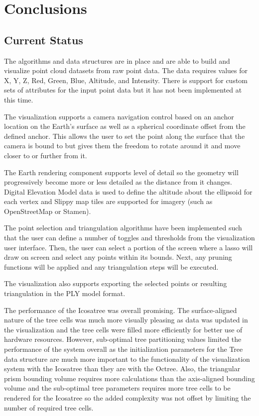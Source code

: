 \chapter{Conclusions}

\section{Current Status}

The algorithms and data structures are in place and are able to build and
visualize point cloud datasets from raw point data. The data requires values for
X, Y, Z, Red, Green, Blue, Altitude, and Intensity. There is support for custom
sets of attributes for the input point data but it has not been implemented at
this time.

The visualization supports a camera navigation control based on an anchor
location on the Earth's surface as well as a spherical coordinate offset from
the defined anchor. This allows the user to set the point along the surface that
the camera is bound to but gives them the freedom to rotate around it and move
closer to or further from it.

The Earth rendering component supports level of detail so the geometry will
progressively become more or less detailed as the distance from it changes.
Digital Elevation Model data is used to define the altitude about the ellipsoid
for each vertex and Slippy map tiles are supported for imagery (such as
OpenStreetMap or Stamen).

The point selection and triangulation algorithms have been implemented such that
the user can define a number of toggles and thresholds from the visualization
user interface. Then, the user can select a portion of the screen where a lasso
will draw on screen and select any points within its bounds. Next, any pruning
functions will be applied and any triangulation steps will be executed.

The visualization also supports exporting the selected points or resulting
triangulation in the PLY model format.

The performance of the Icosatree was overall promising. The surface-aligned
nature of the tree cells was much more visually pleasing as data was updated in
the visualization and the tree cells were filled more efficiently for better
use of hardware resources. However, sub-optimal tree partitioning values limited
the performance of the system overall as the initialization parameters for the
Tree data structure are much more important to the functionality of the
visualization system with the Icosatree than they are with the Octree. Also, the
triangular prism bounding volume requires more calculations than the
axis-aligned bounding volume and the sub-optimal tree parameters requires more
tree cells to be rendered for the Icosatree so the added complexity was not
offset by limiting the number of required tree cells.

